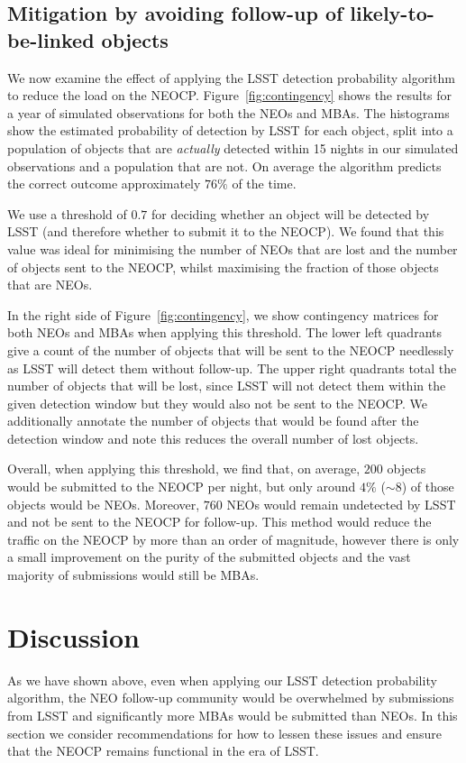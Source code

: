 \documentclass[twocolumn]{aastex631}
\newcommand{\npernightAlg}{200}
\newcommand{\purityAlg}{4}
\newcommand{\purityAlgRaw}{8}
\newcommand{\neoLostAlg}{760}
\newcommand{\efficiencyAlg}{76}
\newcommand{\thresholdAlg}{0.7}
\begin{document}
\subsection{Mitigation by avoiding follow-up of likely-to-be-linked objects}\label{sec:using_alg}
We now examine the effect of applying the LSST detection probability algorithm to reduce the load on the NEOCP. Figure~\ref{fig:contingency} shows the results for a year of simulated observations for both the NEOs and MBAs. The histograms show the estimated probability of detection by LSST for each object, split into a population of objects that are \textit{actually} detected within 15 nights in our simulated observations and a population that are not. On average the algorithm predicts the correct outcome approximately $\efficiencyAlg{}\%$ of the time.

We use a threshold of $\thresholdAlg{}$ for deciding whether an object will be detected by LSST (and therefore whether to submit it to the NEOCP). We found that this value was ideal for minimising the number of NEOs that are lost and the number of objects sent to the NEOCP, whilst maximising the fraction of those objects that are NEOs.

In the right side of Figure~\ref{fig:contingency}, we show contingency matrices for both NEOs and MBAs when applying this threshold. The lower left quadrants give a count of the number of objects that will be sent to the NEOCP needlessly as LSST will detect them without follow-up. The upper right quadrants total the number of objects that will be lost, since LSST will not detect them within the given detection window but they would also not be sent to the NEOCP. We additionally annotate the number of objects that would be found after the detection window and note this reduces the overall number of lost objects.

Overall, when applying this threshold, we find that, on average, $\npernightAlg{}$ objects would be submitted to the NEOCP per night, but only around $\purityAlg{}\%$ (${\sim}\purityAlgRaw{}$) of those objects would be NEOs. Moreover, $\neoLostAlg{}$ NEOs would remain undetected by LSST and not be sent to the NEOCP for follow-up. This method would reduce the traffic on the NEOCP by more than an order of magnitude, however there is only a small improvement on the purity of the submitted objects and the vast majority of submissions would still be MBAs. 

\section{Discussion} \label{sec:discussion}
As we have shown above, even when applying our LSST detection probability algorithm, the NEO follow-up community would be overwhelmed by submissions from LSST and significantly more MBAs would be submitted than NEOs. In this section we consider recommendations for how to lessen these issues and ensure that the NEOCP remains functional in the era of LSST.
\end{document}
